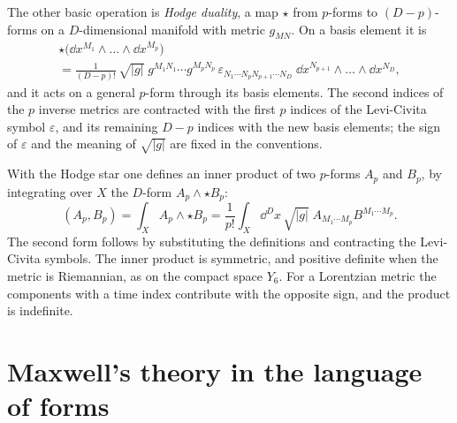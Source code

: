 The other basic operation is \emph{Hodge duality}, a map $\star$ from $p$-forms to $(D-p)$-forms on a $D$-dimensional manifold with metric $g_{MN}$. On a basis element it is
\begin{multline}
  \star\bigl(\dd x^{M_1}\wedge\dots\wedge\dd x^{M_p}\bigr)\\
  = \frac{1}{(D-p)!}\,\sqrt{|g|}\;g^{M_1N_1}\cdots g^{M_pN_p}\,\varepsilon_{N_1\cdots N_pN_{p+1}\cdots N_D}\;\dd x^{N_{p+1}}\wedge\dots\wedge\dd x^{N_D} ,
  \label{eq:L4-hodge}
\end{multline}
and it acts on a general $p$-form through its basis elements. The second indices of the $p$ inverse metrics are contracted with the first $p$ indices of the Levi-Civita symbol $\varepsilon$, and its remaining $D-p$ indices with the new basis elements; the sign of $\varepsilon$ and the meaning of $\sqrt{|g|}$ are fixed in the conventions.

With the Hodge star one defines an inner product of two $p$-forms $A_p$ and $B_p$, by integrating over $X$ the $D$-form $A_p\wedge\star B_p$:
\begin{equation}
  (A_p,B_p) = \int_X A_p\wedge\star B_p = \frac{1}{p!}\int_X\dd^Dx\,\sqrt{|g|}\;A_{M_1\cdots M_p}B^{M_1\cdots M_p} .
  \label{eq:L4-inner}
\end{equation}
The second form follows by substituting the definitions and contracting the Levi-Civita symbols. The inner product is symmetric, and positive definite when the metric is Riemannian, as on the compact space $Y_6$. For a Lorentzian metric the components with a time index contribute with the opposite sign, and the product is indefinite.

\section{Maxwell's theory in the language of forms}
\label{sec:L4-maxwell}

